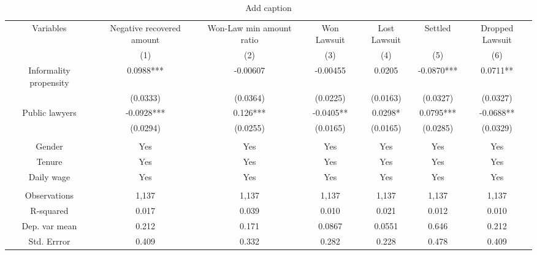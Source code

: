 \begin{table}[htbp]
  \centering
  \caption{Add caption}
    \begin{tabular}{ccccccc}
          &       &       &       &       &       &  \\
    \midrule
    \midrule
    Variables  & \multicolumn{1}{p{5.39em}}{Negative recovered amount} & \multicolumn{1}{p{5.39em}}{Won-Law min amount ratio} & \multicolumn{1}{p{5.39em}}{Won Lawsuit } & \multicolumn{1}{p{5.39em}}{Lost Lawsuit } & \multicolumn{1}{p{5.39em}}{Settled} & \multicolumn{1}{p{5.39em}}{Dropped Lawsuit} \\
    \midrule
          & (1)   & (2)   & (3)   & (4)   & (5)   & (6) \\
    Informality propensity & 0.0988*** & -0.00607 & -0.00455 & 0.0205 & -0.0870*** & 0.0711** \\
          & (0.0333) & (0.0364) & (0.0225) & (0.0163) & (0.0327) & (0.0327) \\
    Public lawyers & -0.0928*** & 0.126*** & -0.0405** & 0.0298* & 0.0795*** & -0.0688** \\
          & (0.0294) & (0.0255) & (0.0165) & (0.0165) & (0.0285) & (0.0329) \\
          &       &       &       &       &       &  \\
    Gender & Yes   & Yes   & Yes   & Yes   & Yes   & Yes \\
    Tenure & Yes   & Yes   & Yes   & Yes   & Yes   & Yes \\
    Daily wage & Yes   & Yes   & Yes   & Yes   & Yes   & Yes \\
          &       &       &       &       &       &  \\
    \midrule
    Observations & 1,137 & 1,137 & 1,137 & 1,137 & 1,137 & 1,137 \\
    R-squared & 0.017 & 0.039 & 0.010 & 0.021 & 0.012 & 0.010 \\
    Dep. var mean & 0.212 & 0.171 & 0.0867 & 0.0551 & 0.646 & 0.212 \\
    Std. Errror & 0.409 & 0.332 & 0.282 & 0.228 & 0.478 & 0.409 \\
    \bottomrule
    \bottomrule
    \end{tabular}%
  \label{tab:addlabel}%
\end{table}%
